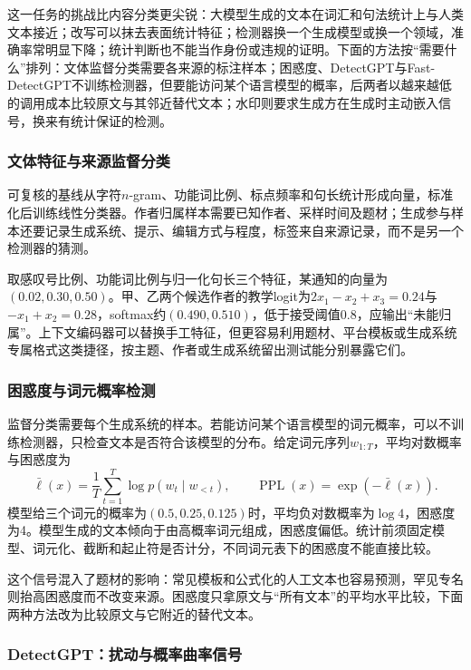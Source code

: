 这一任务的挑战比内容分类更尖锐：大模型生成的文本在词汇和句法统计上与人类文本接近；改写可以抹去表面统计特征；检测器换一个生成模型或换一个领域，准确率常明显下降；统计判断也不能当作身份或违规的证明。下面的方法按“需要什么”排列：文体监督分类需要各来源的标注样本；困惑度、DetectGPT与Fast-DetectGPT不训练检测器，但要能访问某个语言模型的概率，后两者以越来越低的调用成本比较原文与其邻近替代文本；水印则要求生成方在生成时主动嵌入信号，换来有统计保证的检测。

\subsubsection{文体特征与来源监督分类}
\label{sec:nlp-classification-origin-style}

可复核的基线从字符$n$-gram、功能词比例、标点频率和句长统计形成向量，标准化后训练线性分类器。作者归属样本需要已知作者、采样时间及题材；生成参与样本还要记录生成系统、提示、编辑方式与程度，标签来自来源记录，而不是另一个检测器的猜测。

取感叹号比例、功能词比例与归一化句长三个特征，某通知的向量为$(0.02,0.30,0.50)$。甲、乙两个候选作者的教学logit为$2x_1-x_2+x_3=0.24$与$-x_1+x_2=0.28$，softmax约$(0.490,0.510)$，低于接受阈值0.8，应输出“未能归属”。上下文编码器可以替换手工特征，但更容易利用题材、平台模板或生成系统专属格式这类捷径，按主题、作者或生成系统留出测试能分别暴露它们。

\subsubsection{困惑度与词元概率检测}
\label{sec:nlp-classification-origin-perplexity}

监督分类需要每个生成系统的样本。若能访问某个语言模型的词元概率，可以不训练检测器，只检查文本是否符合该模型的分布。给定词元序列$w_{1:T}$，平均对数概率与困惑度为
\[
  \bar\ell(x)=\frac1T\sum_{t=1}^{T}\log p(w_t\mid w_{<t}),
  \qquad \operatorname{PPL}(x)=\exp(-\bar\ell(x)).
\]
模型给三个词元的概率为$(0.5,0.25,0.125)$时，平均负对数概率为$\log4$，困惑度为4。模型生成的文本倾向于由高概率词元组成，困惑度偏低。统计前须固定模型、词元化、截断和起止符是否计分，不同词元表下的困惑度不能直接比较。

这个信号混入了题材的影响：常见模板和公式化的人工文本也容易预测，罕见专名则抬高困惑度而不改变来源。困惑度只拿原文与“所有文本”的平均水平比较，下面两种方法改为比较原文与它附近的替代文本。

\subsubsection{DetectGPT：扰动与概率曲率信号}
\label{sec:nlp-classification-detectgpt}

